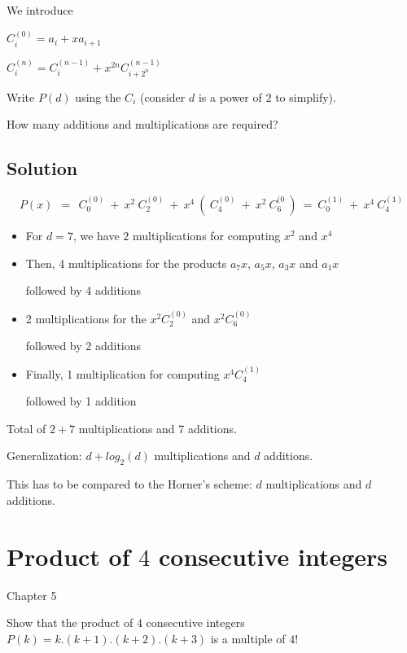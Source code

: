 \documentclass{article}[12pt]
\begin{document}
%

We introduce 

$C_i^{(0)} = a_i + x a_{i+1}$ 

$C_i^{(n)} = C_i^{(n-1)} + x^{2n} C_{i+2^n}^{(n-1)}$ 
\bigskip

Write $P(d)$ using the $C_i$ (consider $d$ is a power of $2$ to simplify).

How many additions and multiplications are required?
\bigskip

\subsection{Solution}
\[
P(x) \ \ = \ \ C_{0}^{(0)} \ + \ x^2 \ C_2^{(0)} \ + 
\ x^4 \ ( \ C_4^{(0)} \ + \ x^2 \ C_6^{(0} \ )
\ = \ C_0^{(1)} \ + \ x^4 \ C_4^{(1)} 
\]

\begin{itemize}
\item
For $d=7$, we have $2$ multiplications for computing $x^2$ and $x^4$
\item
Then, 4 multiplications for the products $a_7 x$,  $a_5 x$, $a_3 x$ and $a_1 x$

followed by 4 additions
\item
2 multiplications for the $x^2 C_2^{(0)}$ and  $x^2 C_6^{(0)}$

followed by 2 additions
\item
Finally, 1 multiplication for computing $x^4 C_4^{(1)}$

followed by 1 addition
\end{itemize}

Total of $2 + 7$ multiplications and $7$ additions.

Generalization: 
$d + log_2(d)$ multiplications and $d$ additions.
\bigskip

This has to be compared to the Horner's scheme: $d$ multiplications and $d$ additions.



\section{Product of $4$ consecutive integers}

Chapter 5

Show that the product of $4$ consecutive integers $P(k) = k.(k+1).(k+2).(k+3)$
is a multiple of $4!$
\end{document}
